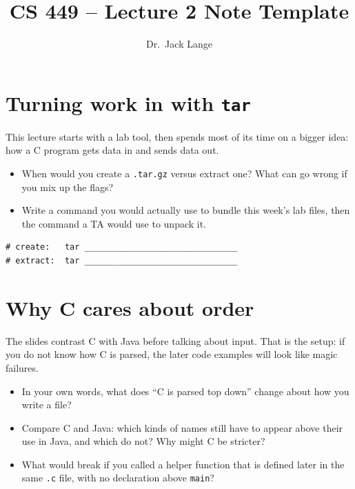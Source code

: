\documentclass[12pt]{article}
\title{CS 449 -- Lecture 2 Note Template}
\author{Dr.\ Jack Lange}
\date{}
\begin{document}
\maketitle

\section{Turning work in with \texttt{tar}}

This lecture starts with a lab tool, then spends most of its time on a bigger idea: how a C program gets data in and sends data out.

\begin{itemize}
  \item When would you create a \texttt{.tar.gz} versus extract one? What can go wrong if you mix up the flags?
  \vspace{2.0em}
  \item Write a command you would actually use to bundle this week's lab files, then the command a TA would use to unpack it.
  \vspace{1.6em}
\end{itemize}

\begin{lstlisting}
# create:   tar _______________________________
# extract:  tar _______________________________
\end{lstlisting}

\vspace{1.4em}

\section{Why C cares about order}

The slides contrast C with Java before talking about input. That is the setup: if you do not know how C is parsed, the later code examples will look like magic failures.

\begin{itemize}
  \item In your own words, what does ``C is parsed top down'' change about how you write a file?
  \vspace{2.2em}
  \item Compare C and Java: which kinds of names still have to appear above their use in Java, and which do not? Why might C be stricter?
  \vspace{2.2em}
  \item What would break if you called a helper function that is defined later in the same \texttt{.c} file, with no declaration above \texttt{main}?
  \vspace{1.8em}
\end{itemize}
\end{document}
